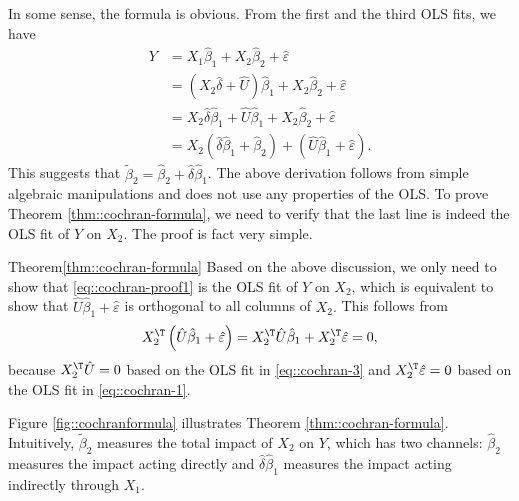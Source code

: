  In some sense, the formula is obvious. From the first and the third OLS fits, we have
\begin{align} 
Y & =X_{1}\hat{\beta}_{1}+X_{2}\hat{\beta}_{2}+\hat{\varepsilon}  \nonumber  \\
 & =\left(X_{2}\hat{\delta}+\hat{U}\right)\hat{\beta}_{1}+X_{2}\hat{\beta}_{2}+\hat{\varepsilon}  \nonumber\\
 & =X_{2}\hat{\delta}\hat{\beta}_{1}+\hat{U}\hat{\beta}_{1}+X_{2}\hat{\beta}_{2}+\hat{\varepsilon}  \nonumber\\
 & =X_{2}\left(\hat{\delta}\hat{\beta}_{1}+\hat{\beta}_{2}\right)+\left(\hat{U}\hat{\beta}_{1}+\hat{\varepsilon}\right).
 \label{eq::cochran-proof1}
\end{align} 
This suggests that $\tilde{\beta}_{2}=\hat{\beta}_{2}+\hat{\delta}\hat{\beta}_{1}$. The above derivation follows from simple algebraic manipulations and does not use any properties of the OLS. To prove Theorem \ref{thm::cochran-formula}, we need to verify that the last line is indeed the OLS fit of $Y$ on $X_2.$ The proof is fact very simple. 
 
 
 \begin{myproof}{Theorem}{\ref{thm::cochran-formula}}
Based on the above discussion, 
we only need to show that \eqref{eq::cochran-proof1} is the OLS fit of $Y$
on $X_{2}$, which is equivalent to show that $\hat{U}\hat{\beta}_{1}+\hat{\varepsilon}$
is orthogonal to all columns of $X_{2}.$ This follows from
\[
X_{2}^{\T}\left(\hat{U}\hat{\beta}_{1}+\hat{\varepsilon}\right)=X_{2}^{\T}\hat{U}\hat{\beta}_{1}+X_{2}^{\T}\hat{\varepsilon}=0,
\]
because $X_{2}^{\T}\hat{U}=0$ based on the OLS fit in \eqref{eq::cochran-3} and $X_{2}^{\T}\hat{\varepsilon}=0$
based on the OLS fit in \eqref{eq::cochran-1}. 
\end{myproof}



Figure \ref{fig::cochranformula} illustrates Theorem \ref{thm::cochran-formula}. Intuitively, $\tilde{\beta}_{2}$  measures the total impact of $X_2$ on $Y$, which has two channels: $\hat{\beta}_{2}$ measures the impact acting directly and $\hat{\delta}\hat{\beta}_{1}$ measures the impact acting indirectly through $X_1$. 



